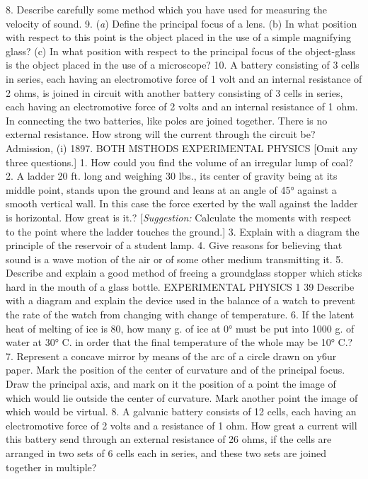 8. Describe carefully some method which you have used for measuring the velocity of sound.
9. (\emph{a}) Define the principal focus of a lens.
(b) In what position with respect to this point is the object placed in the use of a simple magnifying glass?
(c) In what position with respect to the principal focus of the object-glass is the object placed in the use of a microscope?
10. A battery consisting of 3 cells in series, each having an electromotive force of 1 volt and an internal resistance of 2 ohms, is joined in circuit with another battery consisting of 3 cells in series, each having an electromotive force of 2 volts and an internal resistance of 1 ohm. In connecting the two batteries, like poles are joined together. There is no external resistance. How strong will the current through the circuit be?
Admission, (i) 1897.
BOTH MSTHODS EXPERIMENTAL PHYSICS
[Omit any three questions.]
1. How could you find the volume of an irregular lump of coal?
2. A ladder 20 ft. long and weighing 30 lbs., its center of gravity being at its middle point, stands upon the ground and leans at an angle of 45° against a smooth vertical wall. In this case the force exerted by the wall against the ladder is horizontal. How great is it.?
[\emph{Suggestion: } Calculate the moments with respect to the point where the ladder touches the ground.]
3. Explain with a diagram the principle of the reservoir of a student lamp.
4. Give reasons for believing that sound is a wave motion of the air or of some other medium transmitting it.
5. Describe and explain a good method of freeing a groundglass stopper which sticks hard in the mouth of a glass bottle.
EXPERIMENTAL PHYSICS 1 39
Describe with a diagram and explain the device used in the balance of a watch to prevent the rate of the watch from changing with change of temperature.
6. If the latent heat of melting of ice is 80, how many g. of ice at 0° must be put into 1000 g. of water at 30° C. in order that the final temperature of the whole may be 10° C.?
7. Represent a concave mirror by means of the arc of a circle drawn on y6ur paper. Mark the position of the center of curvature and of the principal focus. Draw the principal axis, and mark on it the position of a point the image of which would lie outside the center of curvature. Mark another point the image of which would be virtual.
8. A galvanic battery consists of 12 cells, each having an electromotive force of 2 volts and a resistance of 1 ohm. How great a current will this battery send through an external resistance of 26 ohms, if the cells are arranged in two sets of 6 cells each in series, and these two sets are joined together in multiple?
